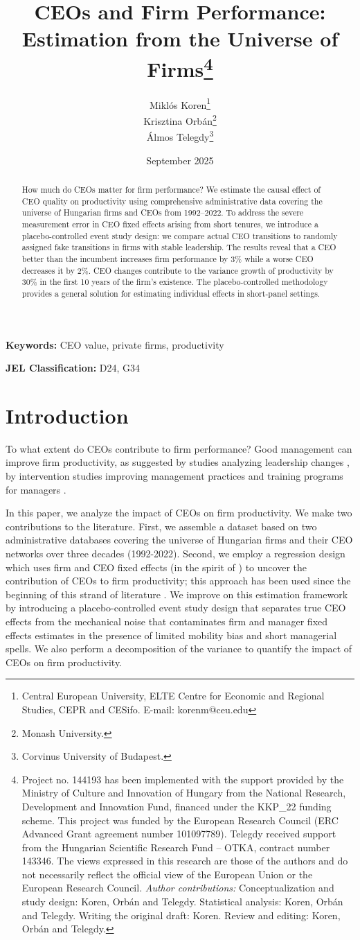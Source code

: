 \documentclass[11pt,a4paper]{article}
\title{CEOs and Firm Performance: Estimation from the Universe of Firms\thanks{Project no. 144193 has been implemented with the support provided by the Ministry of Culture and Innovation of Hungary from the National Research, Development and Innovation Fund, financed under the KKP\_22 funding scheme. This project was funded by the European Research Council (ERC Advanced Grant agreement number 101097789). Telegdy received support from the Hungarian Scientific Research Fund – OTKA, contract number 143346. The views expressed in this research are those of the authors and do not necessarily reflect the official view of the European Union or the European Research Council. \emph{Author contributions:} Conceptualization and study design: Koren, Orbán and Telegdy. Statistical analysis: Koren, Orbán and Telegdy. Writing the original draft: Koren. Review and editing: Koren, Orbán and Telegdy.}}
\author{Miklós Koren\thanks{Central European University, ELTE Centre for Economic and Regional Studies, CEPR and CESifo. E-mail: korenm@ceu.edu} \\
        Krisztina Orbán\thanks{Monash University.} \\
        Álmos Telegdy\thanks{Corvinus University of Budapest.}}
\date{September 2025}
\begin{document}
\maketitle
\thispagestyle{empty}

\begin{abstract}
How much do CEOs matter for firm performance? We estimate the causal effect of CEO quality on productivity using comprehensive administrative data covering the universe of Hungarian firms and CEOs from 1992--2022. To address the severe measurement error in CEO fixed effects arising from short tenures, we introduce a placebo-controlled event study design: we compare actual CEO transitions to randomly assigned fake transitions in firms with stable leadership. The results reveal that a CEO better than the incumbent increases firm performance by 3\% while a worse CEO decreases it by 2\%. CEO changes contribute to the variance growth of productivity by 30\% in the first 10 years of the firm's existence. The placebo-controlled methodology provides a general solution for estimating individual effects in short-panel settings.
\end{abstract}

\textbf{Keywords:} CEO value, private firms, productivity

\textbf{JEL Classification:} D24, G34

\clearpage
\setcounter{page}{1}

\section{Introduction}

To what extent do CEOs contribute to firm performance? Good management can improve firm productivity, as suggested by studies analyzing leadership changes \citep{Bertrand2003-io,bennedsen2020ceos,metcalfe2023managers}, by intervention studies improving management practices \citep{bloom2013does} and training programs for managers \citep{mckenzie2021small, bianchigiorcellitraining}.

In this paper, we analyze the impact of CEOs on firm productivity. We make two contributions to the literature. First, we assemble a dataset based on two administrative databases covering the universe of Hungarian firms and their CEO networks over three decades (1992-2022). Second, we employ a regression design which uses firm and CEO fixed effects (in the spirit of \cite{abowd1999high}) to uncover the contribution of CEOs to firm productivity; this approach has been used since the beginning of this strand of literature \citep{Bertrand2003-io}. We improve on this estimation framework by introducing a placebo-controlled event study design that separates true CEO effects from the mechanical noise that contaminates firm and manager fixed effects estimates in the presence of limited mobility bias and short managerial spells. We also perform a decomposition of the variance to quantify the impact of CEOs on firm productivity.
\end{document}
